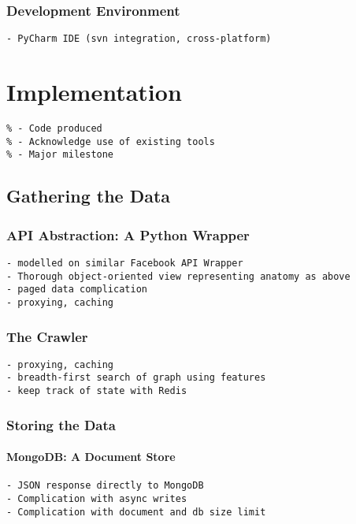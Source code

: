 \documentclass[a4paper,12pt,twoside,notitlepage]{report}
\begin{document}
\subsection{Development Environment}
\begin{verbatim}
- PyCharm IDE (svn integration, cross-platform)
\end{verbatim}


\chapter{Implementation}

\begin{verbatim}
% - Code produced
% - Acknowledge use of existing tools
% - Major milestone 
\end{verbatim}


\section{Gathering the Data}

\subsection{API Abstraction: A Python Wrapper}

\begin{verbatim}
- modelled on similar Facebook API Wrapper
- Thorough object-oriented view representing anatomy as above
- paged data complication
- proxying, caching
\end{verbatim}

\subsection{The Crawler}

\begin{verbatim}
- proxying, caching
- breadth-first search of graph using features
- keep track of state with Redis 
\end{verbatim}

\subsection{Storing the Data}

\subsubsection{MongoDB: A Document Store}
\begin{verbatim}
- JSON response directly to MongoDB
- Complication with async writes
- Complication with document and db size limit
\end{verbatim}
\end{document}
